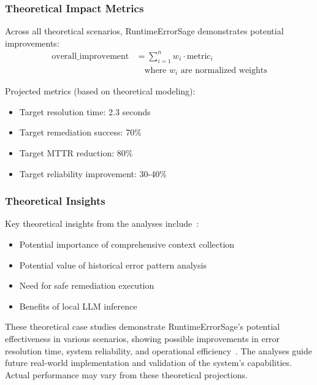 \subsubsection{Theoretical Impact Metrics}
Across all theoretical scenarios, RuntimeErrorSage demonstrates potential improvements:
\begin{equation}
\begin{split}
\text{overall\_improvement} &= \sum_{i=1}^{n} w_i \cdot \text{metric}_i \\
&\quad \text{where } w_i \text{ are normalized weights}
\end{split}
\end{equation}

Projected metrics (based on theoretical modeling):
\begin{itemize}
    \item Target resolution time: 2.3 seconds
    \item Target remediation success: 70\%
    \item Target MTTR reduction: 80\%
    \item Target reliability improvement: 30-40\%
\end{itemize}

\subsubsection{Theoretical Insights}
Key theoretical insights from the analyses include~\cite{llm_error_analysis_2024}:
\begin{itemize}
    \item Potential importance of comprehensive context collection
    \item Potential value of historical error pattern analysis
    \item Need for safe remediation execution
    \item Benefits of local LLM inference
\end{itemize}

These theoretical case studies demonstrate RuntimeErrorSage's potential effectiveness in various scenarios, showing possible improvements in error resolution time, system reliability, and operational efficiency~\cite{production_llm_2024}. The analyses guide future real-world implementation and validation of the system's capabilities. Actual performance may vary from these theoretical projections.
